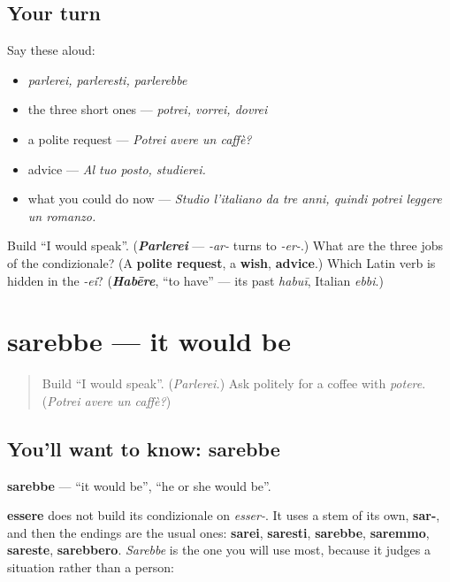 \subsection*{Your turn}
Say these aloud:

\begin{itemize}
\raggedright
  \item \emph{parlerei, parleresti, parlerebbe}
  \item the three short ones — \emph{potrei, vorrei, dovrei}
  \item a polite request — \emph{Potrei avere un caffè?}
  \item advice — \emph{Al tuo posto, studierei.}
  \item what you could do now — \emph{Studio l'italiano da tre anni, quindi potrei leggere un romanzo.}
\end{itemize}

\begin{tcolorbox}[breakable,colback=teal!4,colframe=teal!35!black,title={Before you move on}]
Build \textquotedblleft{}I would speak\textquotedblright{}. (\emph{\textbf{Parlerei}} — \emph{-ar-} turns to \emph{-er-}.) What are the three jobs of the condizionale? (A \textbf{polite request}, a \textbf{wish}, \textbf{advice}.) Which Latin verb is hidden in the \emph{-ei}? (\emph{\textbf{Habēre}}, \textquotedblleft{}to have\textquotedblright{} — its past \emph{habuī}, Italian \emph{ebbi}.)
\end{tcolorbox}
\section[sarebbe]{sarebbe — it would be}

\label{lesson:IT-C272-sarebbe}



\begin{quote}
Build \textquotedblleft{}I would speak\textquotedblright{}. (\emph{Parlerei.}) Ask politely for a coffee with \emph{potere}. (\emph{Potrei avere un caffè?})
\end{quote}

\subsection*{You'll want to know: sarebbe}
\textbf{sarebbe} — \textquotedblleft{}it would be\textquotedblright{}, \textquotedblleft{}he or she would be\textquotedblright{}.

\textbf{essere} does not build its condizionale on \emph{esser-}. It uses a stem of its own, \textbf{sar-}, and then the endings are the usual ones: \textbf{sarei}, \textbf{saresti}, \textbf{sarebbe}, \textbf{saremmo}, \textbf{sareste}, \textbf{sarebbero}. \emph{Sarebbe} is the one you will use most, because it judges a situation rather than a person:

